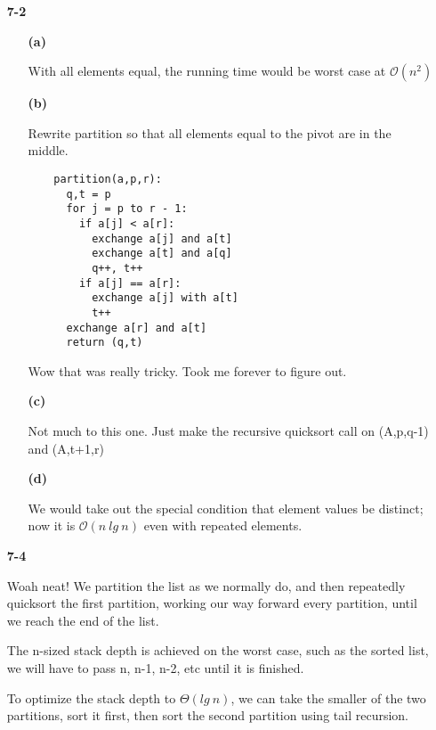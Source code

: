 \documentclass{article}
\begin{document}
\begin{enumerate}
\item[\textbf{7-2}]

		\begin{enumerate}

		\item[\textbf{(a)}]

		With all elements equal, the running time would be worst case at $\mathcal{O}(n^2)$

		\item[\textbf{(b)}]

		Rewrite partition so that all elements equal to the pivot are in the middle.

    \begin{verbatim}
    partition(a,p,r):
      q,t = p
      for j = p to r - 1:
        if a[j] < a[r]:
          exchange a[j] and a[t]
          exchange a[t] and a[q]
          q++, t++
        if a[j] == a[r]:
          exchange a[j] with a[t]
          t++
      exchange a[r] and a[t]
      return (q,t)
    \end{verbatim}

	Wow that was really tricky. Took me forever to figure out.

		\item[\textbf{(c)}]

	Not much to this one. Just make the recursive quicksort call on (A,p,q-1) and (A,t+1,r)

		\item[\textbf{(d)}]

	We would take out the special condition that element values be distinct; now it
	is $\mathcal{O}(n\ lg\ n)$ even with repeated elements.

		\end{enumerate}

\item[\textbf{7-4}]

Woah neat! We partition the list as we normally do, and then repeatedly
quicksort the first partition, working our way forward every partition, until
we reach the end of the list.

The n-sized stack depth is achieved on the worst case, such as the sorted list,
we will have to pass n, n-1, n-2, etc until it is finished.

To optimize the stack depth to $\Theta(lg\ n)$, we can take the smaller of the
two partitions, sort it first, then sort the second partition using tail
recursion.

\end{enumerate}
\end{document}
